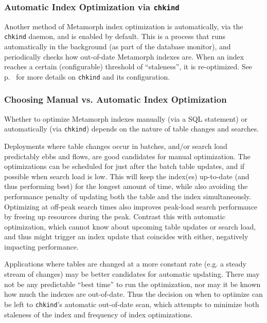 \subsubsection{Automatic Index Optimization via {\tt chkind}}

  Another method of Metamorph index optimization is automatically, via
the \verb`chkind` daemon, and is enabled by default.  This is a
process that runs automatically in the background (as part of the
database monitor), and periodically checks how out-of-date Metamorph
indexes are.  When an index reaches a certain (configurable) threshold
of ``staleness'', it is re-optimized.  See p.~\pageref{chkindDaemon}
for more details on \verb`chkind` and its configuration.

\subsubsection{Choosing Manual vs. Automatic Index Optimization}

  Whether to optimize Metamorph indexes manually (via a SQL statement)
or automatically (via \verb`chkind`) depends on the nature of table
changes and searches.

  Deployments where table changes occur in batches, and/or search load
predictably ebbs and flows, are good candidates for manual
optimization.  The optimizations can be scheduled for just after the
batch table updates, and if possible when search load is low.  This
will keep the index(es) up-to-date (and thus performing best) for the
longest amount of time, while also avoiding the performance penalty of
updating both the table and the index simultaneously.  Optimizing at
off-peak search times also improves peak-load search performance by
freeing up resources during the peak.  Contrast this with automatic
optimization, which cannot know about upcoming table updates or search
load, and thus might trigger an index update that coincides with
either, negatively impacting performance.

  Applications where tables are changed at a more constant rate
(e.g. a steady stream of changes) may be better candidates for
automatic updating.  There may not be any predictable ``best time'' to
run the optimization, nor may it be known how much the indexes are
out-of-date.  Thus the decision on when to optimize can be left to
\verb`chkind`'s automatic out-of-date scan, which attempts to minimize
both staleness of the index and frequency of index optimizations.

